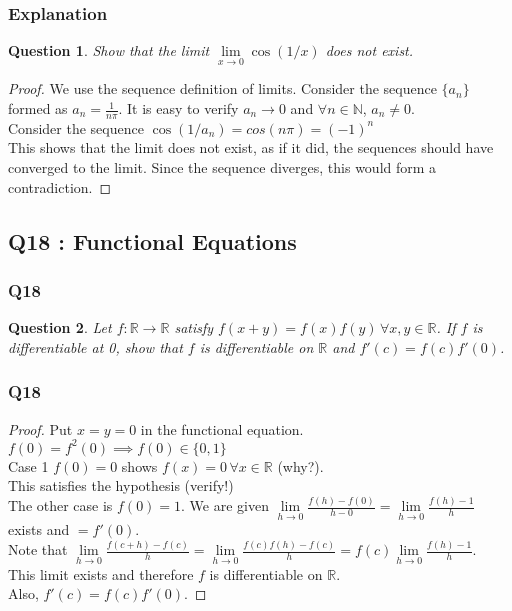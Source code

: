 \documentclass[handout,aspectratio=169]{beamer}
\newtheorem{qsn}{Question}
\newcommand{\bN}{\mathbb{N}}
\newcommand{\bR}{\mathbb{R}}
\begin{document}
\begin{frame}
\frametitle{Explanation}
\begin{qsn}
Show that the limit $\lim\limits_{x\to 0} \cos(1/x)$ does not exist.
\end{qsn}
\begin{proof}
We use the sequence definition of limits. Consider the sequence $\{a_n\}$ formed as $a_n = \frac{1}{n\pi}$. It is easy to verify $a_n \to 0$ and $\forall n \in \bN$, $a_n \neq 0$.\\
Consider the sequence $\cos(1/a_n) = cos(n\pi) = (-1)^n$\\
This shows that the limit does not exist, as if it did, the sequences should have converged to the limit. Since the sequence diverges, this would form a contradiction.
\end{proof}
\end{frame}

\subsection{Q18 : Functional Equations}

\begin{frame}
\pause
\frametitle{Q18}
\begin{qsn}
Let $f : \bR \to \bR$ satisfy $f(x+y) = f(x)f(y) \,\forall x,y \in \bR$. If $f$ is differentiable at 0, show that $f$ is differentiable on $\bR$ and $f'(c) = f(c)f'(0)$.
\end{qsn}
\end{frame}

\begin{frame}
\pause
\frametitle{Q18}
\begin{proof}
Put $x=y=0$ in the functional equation. \\ \pause
$f(0) = f^2(0) \implies f(0) \in \{0,1\}$ \\ \pause
Case 1 $f(0) = 0$ shows $f(x) = 0 \,\forall x \in \bR$ (why?).\\ \pause
This satisfies the hypothesis (verify!) \\ \pause
The other case is $f(0) = 1$. We are given $\lim\limits_{h\to 0} \frac{f(h) - f(0)}{h-0} = \lim\limits_{h\to 0} \frac{f(h)-1}{h}$ exists and $=f'(0)$. \\ \pause
Note that $\lim\limits_{h\to 0} \frac{f(c+h)-f(c)}{h} = \lim\limits_{h\to 0} \frac{f(c)f(h)-f(c)}{h} = f(c)\lim\limits_{h\to 0} \frac{f(h)-1}{h}$.\\ \pause
This limit exists and therefore $f$ is differentiable on $\bR$.\\ \pause
Also, $f'(c) = f(c)f'(0)$.
\end{proof}
\end{frame}
\end{document}
